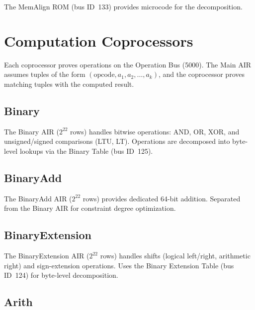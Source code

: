 The MemAlign ROM (bus ID~133) provides microcode for the decomposition.

\section{Computation Coprocessors}
\label{sec:coprocessors}

Each coprocessor proves operations on the Operation Bus (5000).
The Main AIR assumes tuples of the form
$(\mathrm{opcode}, a_1, a_2, \ldots, a_k)$,
and the coprocessor proves matching tuples with the computed result.

\subsection{Binary}
\label{sec:binary}

The Binary AIR ($2^{22}$ rows) handles bitwise operations:
AND, OR, XOR, and unsigned/signed comparisons (LTU, LT).
Operations are decomposed into byte-level lookups via the
Binary Table (bus ID~125).

\subsection{BinaryAdd}
\label{sec:binaryadd}

The BinaryAdd AIR ($2^{22}$ rows) provides dedicated 64-bit addition.
Separated from the Binary AIR for constraint degree optimization.

\subsection{BinaryExtension}
\label{sec:binaryext}

The BinaryExtension AIR ($2^{22}$ rows) handles shifts
(logical left/right, arithmetic right) and sign-extension operations.
Uses the Binary Extension Table (bus ID~124) for byte-level decomposition.

\subsection{Arith}
\label{sec:arith}

